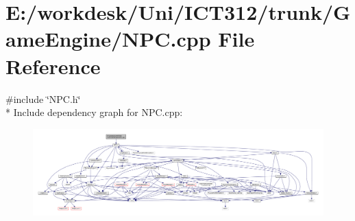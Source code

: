 \section{E\+:/workdesk/\+Uni/\+I\+C\+T312/trunk/\+Game\+Engine/\+N\+P\+C.cpp File Reference}
\label{_n_p_c_8cpp}
{\ttfamily \#include \char`\"{}N\+P\+C.\+h\char`\"{}}\\*
Include dependency graph for N\+P\+C.\+cpp\+:
\nopagebreak
\begin{figure}[H]
\begin{center}
\leavevmode
\includegraphics[width=350pt]{df/d64/_n_p_c_8cpp__incl}
\end{center}
\end{figure}
